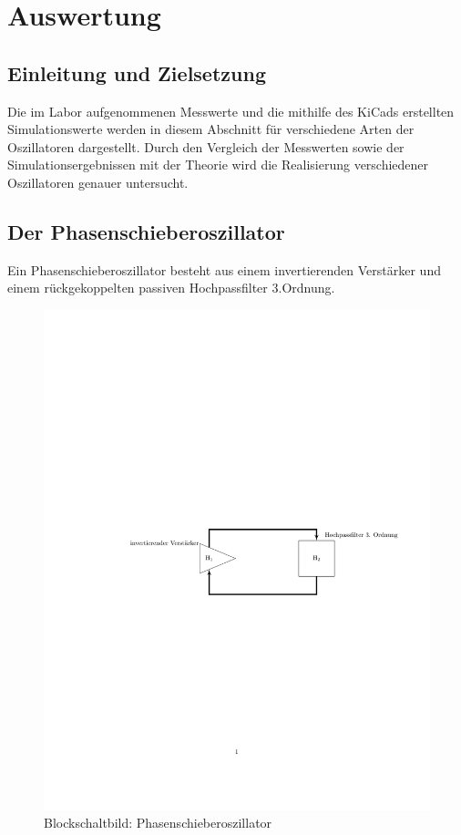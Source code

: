 \section{Auswertung}
\subsection{ Einleitung und Zielsetzung}
Die im Labor aufgenommenen Messwerte und die mithilfe des KiCads erstellten Simulationswerte werden in diesem Abschnitt für verschiedene Arten der Oszillatoren dargestellt. Durch den Vergleich der Messwerten sowie der Simulationsergebnissen mit der Theorie wird die Realisierung verschiedener Oszillatoren genauer untersucht.

\subsection{Der Phasenschieberoszillator}

Ein Phasenschieberoszillator besteht aus einem invertierenden Verstärker und einem rückgekoppelten passiven Hochpassfilter 3.Ordnung.

 \begin{figure}[H]
  \centering
  \includegraphics[width=\linewidth]{Elektronik-Laborprotokoll_Filter/Abbildungen/Blockschaltbild_Phasenschieberoszillator.pdf}
  \caption{Blockschaltbild: Phasenschieberoszillator}
  \label{fig:Phasenschieberoszillator_Block}
\end{figure}



